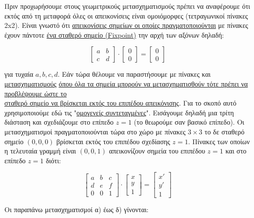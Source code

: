 Πριν προχωρήσουμε στους γεωμετρικούς μετασχηματισμούς πρέπει να αναφέρουμε ότι εκτός από τη μεταφορά όλες οι απεικονίσεις είναι ομοιόμορφες (τετραγωνικοί πίνακες 2x2). Είναι γνωστό ότι \underline{απεικονίσεις σημείων οι οποίες πραγματοποιούνται} με πίνακες έχουν πάντοτε \underline{ένα σταθερό σημείο (Fixpoint)} την αρχή των αξόνων δηλαδή:

\[
\begin{bmatrix} a & b \\ c & d \end{bmatrix} \cdot \begin{bmatrix} 0 \\ 0 \end{bmatrix} = \begin{bmatrix} 0 \\ 0 \end{bmatrix}
\]

 για τυχαία \( a,b,c,d. \) Εάν τώρα θέλουμε να παραστήσουμε με πίνακες και \underline{μετασχηματισμούς} \underline{όπου όλα τα σημεία μπορούν να μετασχηματισθούν τότε πρέπει να προβλέψουμε ώστε το}\\ \underline{σταθερό σημείο να βρίσκεται εκτός του επιπέδου απεικόνισης}. Για το σκοπό αυτό χρησιμοποιούμε εδώ τις "\underline{ομογενείς συντεταγμένες}". Εισάγουμε δηλαδή μια τρίτη διάσταση και σχεδιάζουμε στο επίπεδο \( z=1 \) (το θεωρούμε σαν βασικό επίπεδο). Οι μετασχηματισμοί πραγματοποιούνται τώρα στο χώρο με πίνακες \( 3 \times 3 \) το δε σταθερό σημείο \( (0,0,0) \) βρίσκεται εκτός του επιπέδου σχεδίασης \( z=1 \). Πίνακες των οποίων η τελευταία γραμμή είναι \( (0,0,1) \) απεικονίζουν σημεία του επιπέδου  $z=1$ και στο επίπεδο $z=1$ διότι:

\[
\begin{bmatrix} a & b & c \\ d & e & f \\ 0 & 0 & 1 \end{bmatrix} \cdot \begin{bmatrix} x \\ y \\ 1 \end{bmatrix} = \begin{bmatrix} x' \\ y' \\ 1 \end{bmatrix}
\]

 Οι παραπάνω μετασχηματισμοί α) έως δ) γίνονται:


